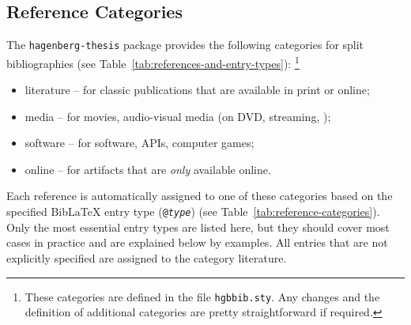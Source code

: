 \subsection{Reference Categories}
\label{sec:reference-categories}

The \texttt{hagenberg-thesis} package provides the following categories for split
bibliographies (see Table~\ref{tab:references-and-entry-types}):%
\footnote{These categories are defined in the file \nolinkurl{hgbbib.sty}. Any
changes and the definition of additional categories are pretty straightforward
if required.}
%
\begin{itemize}
    \item[] \textsf{literature} -- for classic publications that are available
    in print or online;
    \item[] \textsf{media} -- for movies, audio-visual media (on DVD,
    streaming, \etc);
    \item[] \textsf{software} -- for software, APIs, computer games;
    \item[] \textsf{online} -- for artifacts that are \emph{only} available
    online.
\end{itemize}
%
Each reference is automatically assigned to one of these categories based on the
specified BibLaTeX entry type (\texttt{@\emph{type}}) (see
Table~\ref{tab:reference-categories}). Only the most essential entry types are
listed here, but they should cover most cases in practice and are explained
below by examples. All entries that are not explicitly specified are assigned to
the category \textsf{literature}.



